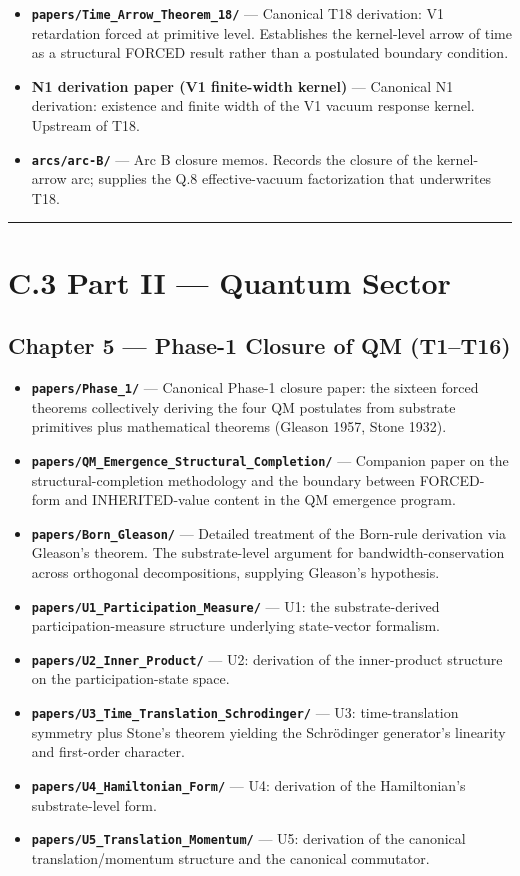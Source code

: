 \documentclass[11pt]{book}
\begin{document}
\begin{itemize}
\item \textbf{\texttt{papers/Time\_Arrow\_Theorem\_18/}} — Canonical T18 derivation: V1 retardation forced at primitive level. Establishes the kernel-level arrow of time as a structural FORCED result rather than a postulated boundary condition.
\item \textbf{N1 derivation paper (V1 finite-width kernel)} — Canonical N1 derivation: existence and finite width of the V1 vacuum response kernel. Upstream of T18.
\item \textbf{\texttt{arcs/arc-B/}} — Arc B closure memos. Records the closure of the kernel-arrow arc; supplies the Q.8 effective-vacuum factorization that underwrites T18.
\end{itemize}

\bigskip\hrule\bigskip

\section{C.3 Part II — Quantum Sector}

\subsection{Chapter 5 — Phase-1 Closure of QM (T1–T16)}

\begin{itemize}
\item \textbf{\texttt{papers/Phase\_1/}} — Canonical Phase-1 closure paper: the sixteen forced theorems collectively deriving the four QM postulates from substrate primitives plus mathematical theorems (Gleason 1957, Stone 1932).
\item \textbf{\texttt{papers/QM\_Emergence\_Structural\_Completion/}} — Companion paper on the structural-completion methodology and the boundary between FORCED-form and INHERITED-value content in the QM emergence program.
\item \textbf{\texttt{papers/Born\_Gleason/}} — Detailed treatment of the Born-rule derivation via Gleason's theorem. The substrate-level argument for bandwidth-conservation across orthogonal decompositions, supplying Gleason's hypothesis.
\item \textbf{\texttt{papers/U1\_Participation\_Measure/}} — U1: the substrate-derived participation-measure structure underlying state-vector formalism.
\item \textbf{\texttt{papers/U2\_Inner\_Product/}} — U2: derivation of the inner-product structure on the participation-state space.
\item \textbf{\texttt{papers/U3\_Time\_Translation\_Schrodinger/}} — U3: time-translation symmetry plus Stone's theorem yielding the Schrödinger generator's linearity and first-order character.
\item \textbf{\texttt{papers/U4\_Hamiltonian\_Form/}} — U4: derivation of the Hamiltonian's substrate-level form.
\item \textbf{\texttt{papers/U5\_Translation\_Momentum/}} — U5: derivation of the canonical translation/momentum structure and the canonical commutator.
\end{itemize}
\end{document}
